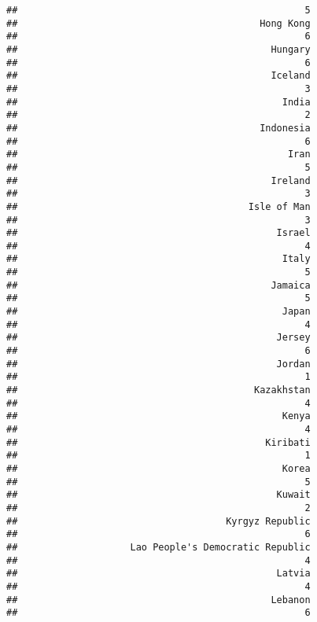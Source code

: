\documentclass[
]{article}
\begin{document}
\begin{verbatim}
##                                                   5 
##                                           Hong Kong 
##                                                   6 
##                                             Hungary 
##                                                   6 
##                                             Iceland 
##                                                   3 
##                                               India 
##                                                   2 
##                                           Indonesia 
##                                                   6 
##                                                Iran 
##                                                   5 
##                                             Ireland 
##                                                   3 
##                                         Isle of Man 
##                                                   3 
##                                              Israel 
##                                                   4 
##                                               Italy 
##                                                   5 
##                                             Jamaica 
##                                                   5 
##                                               Japan 
##                                                   4 
##                                              Jersey 
##                                                   6 
##                                              Jordan 
##                                                   1 
##                                          Kazakhstan 
##                                                   4 
##                                               Kenya 
##                                                   4 
##                                            Kiribati 
##                                                   1 
##                                               Korea 
##                                                   5 
##                                              Kuwait 
##                                                   2 
##                                     Kyrgyz Republic 
##                                                   6 
##                    Lao People's Democratic Republic 
##                                                   4 
##                                              Latvia 
##                                                   4 
##                                             Lebanon 
##                                                   6 

\end{verbatim}
\end{document}
